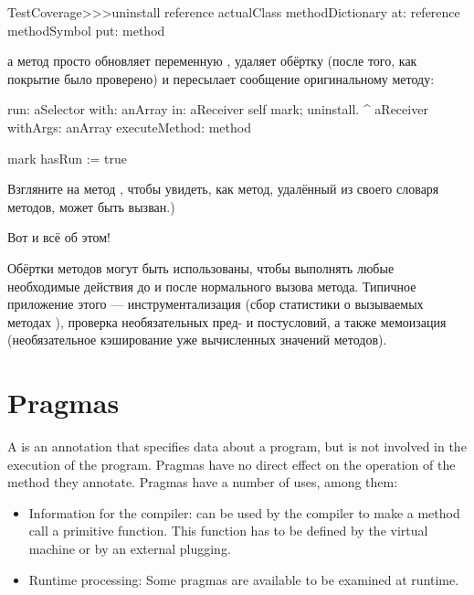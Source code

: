 \documentclass[a4paper,10pt,twoside]{book}
\begin{document}
{\begin{code}{}
TestCoverage>>>uninstall
	reference actualClass methodDictionary
		at: reference methodSymbol
		put: method
\end{code}
\noindent
а метод  просто обновляет переменную , удаляет обёртку (после того, как покрытие было проверено) и пересылает сообщение оригинальному методу:
\begin{code}{}
run: aSelector with: anArray in: aReceiver
	self mark; uninstall.
	^ aReceiver withArgs: anArray executeMethod: method

mark
	hasRun := true
\end{code}
Взгляните на метод , чтобы увидеть, как метод, удалённый из своего словаря методов, может быть вызван.)

Вот и всё об этом!

Обёртки методов могут быть использованы, чтобы выполнять любые необходимые действия до и после нормального вызова метода. Типичное приложение этого --- инструментализация (сбор статистики о вызываемых методах ), проверка необязательных пред- и постусловий, а также мемоизация (необязательное кэширование уже вычисленных значений методов). 

\section{Pragmas}

A  is an annotation that specifies data about a program, but is not involved in the execution of the program. Pragmas have no direct effect on the operation of the method they annotate.
Pragmas have a number of uses, among them:
\begin{itemize}
\item Information for the compiler:  can be used by the compiler to make a method call a primitive function. This function has to be defined by the virtual machine or by an external plugging.
\item Runtime processing: Some pragmas are available to be examined at runtime.
\end{itemize}

}
\end{document}
